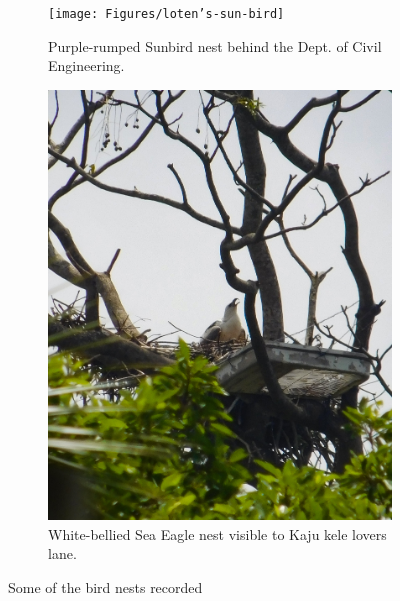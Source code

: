 \begin{figure}[!htpb]
    
    \begin{subfigure}{0.45\textwidth}
        \texttt{[image: Figures/loten's-sun-bird]}
        \caption{Purple-rumped Sunbird nest behind the Dept. of Civil Engineering.}
        \label{fig:figure-02.2}
    \end{subfigure}
    \hspace{.5cm} %
    \begin{subfigure}{0.45\textwidth}
        \includegraphics[width=\textwidth]{Figures/white-bellied-sea-eagle.jpg}
        \caption{White-bellied Sea Eagle nest visible to Kaju kele lovers lane.}
        \label{fig:figure-02.2}
    \end{subfigure}
    \caption{Some of the bird nests recorded}
    \label{fig:figure-02}
\end{figure}

